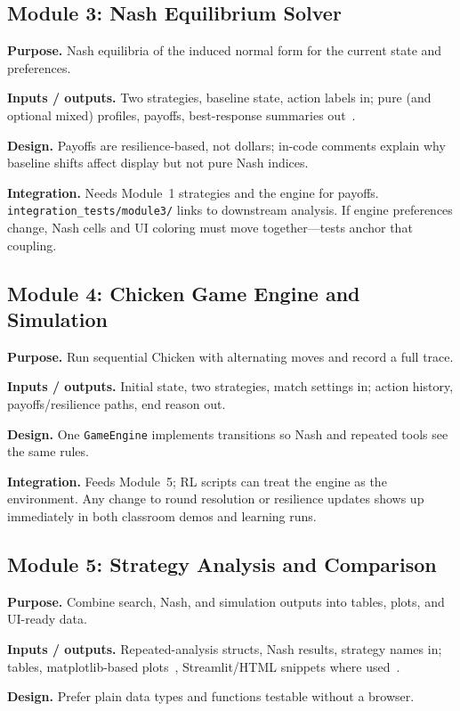\subsection{Module 3: Nash Equilibrium Solver}
\textbf{Purpose.} Nash equilibria of the induced normal form for the current state and preferences.

\textbf{Inputs / outputs.} Two strategies, baseline state, action labels in; pure (and optional mixed) profiles, payoffs, best-response summaries out~\cite{nashpy,nash1950}.

\textbf{Design.} Payoffs are resilience-based, not dollars; in-code comments explain why baseline shifts affect display but not pure Nash indices.

\textbf{Integration.} Needs Module~1 strategies and the engine for payoffs. \texttt{integration\_tests/module3/} links to downstream analysis. If engine preferences change, Nash cells and UI coloring must move together---tests anchor that coupling.

\subsection{Module 4: Chicken Game Engine and Simulation}
\textbf{Purpose.} Run sequential Chicken with alternating moves and record a full trace.

\textbf{Inputs / outputs.} Initial state, two strategies, match settings in; action history, payoffs/resilience paths, end reason out.

\textbf{Design.} One \texttt{GameEngine} implements transitions so Nash and repeated tools see the same rules.

\textbf{Integration.} Feeds Module~5; RL scripts can treat the engine as the environment. Any change to round resolution or resilience updates shows up immediately in both classroom demos and learning runs.

\subsection{Module 5: Strategy Analysis and Comparison}
\textbf{Purpose.} Combine search, Nash, and simulation outputs into tables, plots, and UI-ready data.

\textbf{Inputs / outputs.} Repeated-analysis structs, Nash results, strategy names in; tables, matplotlib-based plots~\cite{matplotlib}, Streamlit/HTML snippets where used~\cite{streamlit}.

\textbf{Design.} Prefer plain data types and functions testable without a browser.

